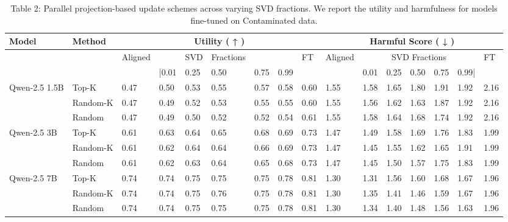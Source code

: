 \documentclass[10pt]{article}
\begin{document}
\begin{table}[h]
\begin{center}
\captionsetup{labelformat=empty}
\caption{Table 2: Parallel projection-based update schemes across varying SVD fractions. We report the utility and harmfulness for models fine-tuned on Contaminated data.}
\begin{tabular}{|l|l|l|l|l|l|l|l|l|l|l|l|l|l|l|l|}
\hline
\multirow{3}{*}{Model} & \multirow{3}{*}{Method} & \multicolumn{7}{|c|}{Utility ( ↑ )} & \multicolumn{7}{|c|}{Harmful Score ( ↓ )} \\
\hline
 &  & Aligned &  & SVD & Fractions &  &  & FT & \multirow[t]{2}{*}{Aligned} & \multicolumn{5}{|c|}{SVD Fractions} & \multirow[t]{2}{*}{FT} \\
\hline
 &  &  & |0.01 & 0.25 & 0.50 & 0.75 & 0.99 &  &  & 0.01 & 0.25 & 0.50 & 0.75 & 0.99| &  \\
\hline
\multirow{3}{*}{Qwen-2.5 1.5B} & Top-K & 0.47 & 0.50 & 0.53 & 0.55 & 0.57 & 0.58 & 0.60 & 1.55 & 1.58 & 1.65 & 1.80 & 1.91 & 1.92 & 2.16 \\
\hline
 & Random-K & 0.47 & 0.49 & 0.52 & 0.53 & 0.55 & 0.55 & 0.60 & 1.55 & 1.56 & 1.62 & 1.63 & 1.87 & 1.92 & 2.16 \\
\hline
 & Random & 0.47 & 0.49 & 0.50 & 0.52 & 0.52 & 0.54 & 0.61 & 1.55 & 1.58 & 1.64 & 1.68 & 1.74 & 1.92 & 2.16 \\
\hline
\multirow{3}{*}{Qwen-2.5 3B} & Top-K & 0.61 & 0.63 & 0.64 & 0.65 & 0.68 & 0.69 & 0.73 & 1.47 & 1.49 & 1.58 & 1.69 & 1.76 & 1.83 & 1.99 \\
\hline
 & Random-K & 0.61 & 0.62 & 0.64 & 0.64 & 0.66 & 0.69 & 0.73 & 1.47 & 1.45 & 1.55 & 1.62 & 1.65 & 1.91 & 1.99 \\
\hline
 & Random & 0.61 & 0.62 & 0.63 & 0.64 & 0.65 & 0.68 & 0.73 & 1.47 & 1.45 & 1.50 & 1.57 & 1.75 & 1.83 & 1.99 \\
\hline
\multirow{3}{*}{Qwen-2.5 7B} & Top-K & 0.74 & 0.74 & 0.75 & 0.75 & 0.75 & 0.78 & 0.81 & 1.30 & 1.31 & 1.56 & 1.60 & 1.68 & 1.67 & 1.96 \\
\hline
 & Random-K & 0.74 & 0.74 & 0.75 & 0.76 & 0.75 & 0.78 & 0.81 & 1.30 & 1.35 & 1.41 & 1.46 & 1.59 & 1.67 & 1.96 \\
\hline
 & Random & 0.74 & 0.74 & 0.75 & 0.75 & 0.75 & 0.78 & 0.81 & 1.30 & 1.34 & 1.40 & 1.48 & 1.56 & 1.63 & 1.96 \\
\hline
\end{tabular}
\end{center}
\end{table}
\end{document}
